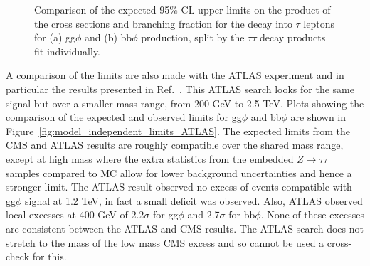 \begin{figure}[!hbtp]
\centering
\caption{Comparison of the expected 95\% CL upper limits on the product of the cross sections and branching fraction for the decay into $\tau$ leptons for (a) gg$\phi$ and (b) bb$\phi$ production, split by the $\tau\tau$ decay products fit individually.}
\label{fig:model_independent_limits_by_channel}
\end{figure}

A comparison of the limits are also made with the ATLAS experiment and in particular the results presented in Ref.~\cite{ATLAS:2020zms}.
This ATLAS search looks for the same signal but over a smaller mass range, from 200 GeV to 2.5 TeV.
Plots showing the comparison of the expected and observed limits for gg$\phi$ and bb$\phi$ are shown in Figure~\ref{fig:model_independent_limits_ATLAS}.
The expected limits from the CMS and ATLAS results are roughly compatible over the shared mass range, except at high mass where the extra statistics from the embedded $Z\rightarrow \tau\tau$ samples compared to MC allow for lower background uncertainties and hence a stronger limit.
The ATLAS result observed no excess of events compatible with gg$\phi$ signal at 1.2 TeV, in fact a small deficit was observed.
Also, ATLAS observed local excesses at 400 GeV of 2.2$\sigma$ for gg$\phi$ and 2.7$\sigma$ for bb$\phi$.
None of these excesses are consistent between the ATLAS and CMS results.
The ATLAS search does not stretch to the mass of the low mass CMS excess and so cannot be used a cross-check for this.


